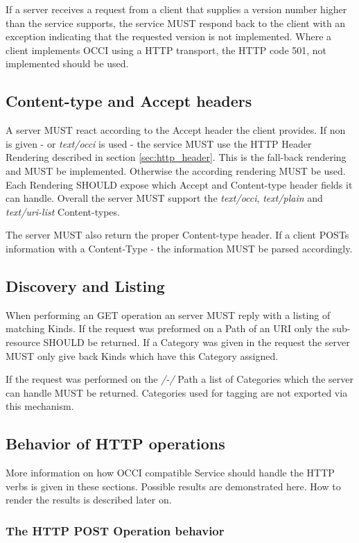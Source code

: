 \documentclass[10pt,a4paper]{article}
\begin{document}
If a server receives a request from a client that supplies a version number higher than the service supports, the service MUST respond back to the client with an exception indicating that the requested version is not implemented. Where a client implements OCCI using a HTTP transport, the HTTP code 501, not implemented should be used. 

\subsection{Content-type and Accept headers}
A server MUST react according to the Accept header the client provides. If non is given - or \textit{text/occi} is used - the service MUST use the HTTP Header Rendering described in section \ref{sec:http_header}. This is the fall-back rendering and MUST be implemented. Otherwise the according rendering MUST be used. Each Rendering SHOULD expose which Accept and Content-type header fields it can handle. Overall the server MUST support the \textit{text/occi}, \textit{text/plain} and \textit{text/uri-list} Content-types.

The server MUST also return the proper Content-type header. If a client POSTs information with a Content-Type - the information MUST be parsed accordingly.

\subsection{Discovery and Listing}
When performing an GET operation an server MUST reply with a listing of matching Kinds. If the request was preformed on a Path of an URI only the sub-resource SHOULD be returned. If a Category was given in the request the server MUST only give back Kinds which have this Category assigned.

If the request was performed on the \textit{/-/} Path a list of Categories which the server can handle MUST be returned. Categories used for tagging are not exported via this mechanism.

\subsection{Behavior of HTTP operations}

More information on how OCCI compatible Service should handle the HTTP verbs is given in these sections. Possible results are demonstrated here. How to render the results is described later on.

\newpage
\subsubsection{The HTTP POST Operation behavior}
\end{document}
